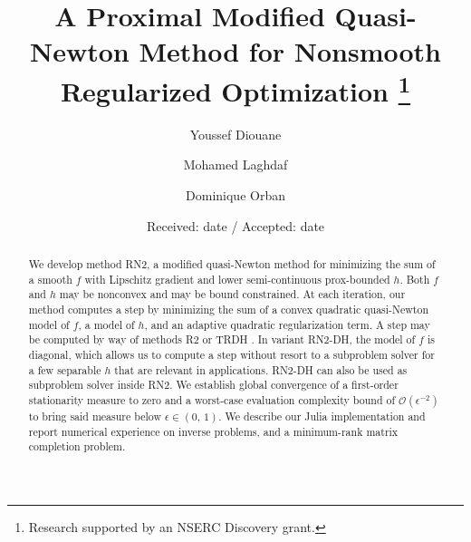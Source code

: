 \documentclass[smallextended]{svjour3}       %
\newcommand{\papertitle}{A Proximal Modified Quasi-Newton Method for Nonsmooth Regularized Optimization}
\begin{document}
\title{%
  \papertitle
  \thanks{Research supported by an NSERC Discovery grant.}%
}


\author{Youssef Diouane \and
        Mohamed Laghdaf \and
        Dominique Orban
}



\date{Received: date / Accepted: date}

\linenumbers
\pagestyle{myheadings}

\maketitle
\thispagestyle{mytitlepage}

\begin{abstract}
  We develop method RN2, a modified quasi-Newton method for minimizing the sum of a smooth \(f\) with Lipschitz gradient and lower semi-continuous prox-bounded \(h\).
  Both \(f\) and \(h\) may be nonconvex and may be bound constrained.
  At each iteration, our method computes a step by minimizing the sum of a convex quadratic quasi-Newton model of \(f\), a model of \(h\), and an adaptive quadratic regularization term. 
  A step may be computed by way of methods R2 \citep{aravkin-baraldi-orban-2022} or TRDH \citep{leconte-orban-2023}.
  In variant RN2-DH, the model of \(f\) is diagonal, which allows us to compute a step without resort to a subproblem solver for a few separable \(h\) that are relevant in applications.
  RN2-DH can also be used as subproblem solver inside RN2.
  We establish global convergence of a first-order stationarity measure to zero and a worst-case evaluation complexity bound of \(\mathcal{O}(\epsilon^{-2})\) to bring said measure below \(\epsilon \in (0, \, 1)\).
  We describe our Julia implementation and report numerical experience on inverse problems, and a minimum-rank matrix completion problem.
\end{abstract}
\end{document}

